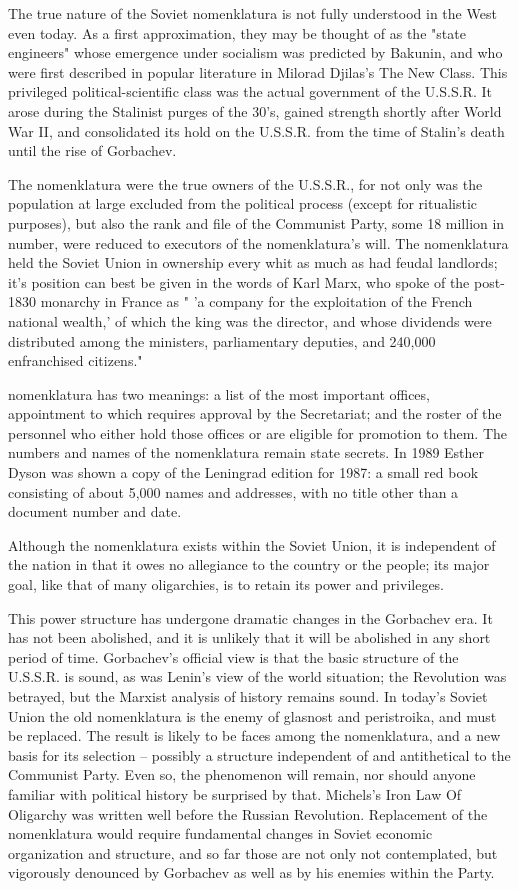 The true nature of the Soviet nomenklatura is not fully understood in the West even today. As a first approximation, they may be thought of as the "state engineers" whose emergence under socialism was predicted by Bakunin, and who were first described in popular literature in Milorad Djilas's The New Class. This privileged political-scientific class was the actual government of the U.S.S.R. It arose during the Stalinist purges of the 30's, gained strength shortly after World War II, and consolidated its hold on the U.S.S.R. from the time of Stalin's death until the rise of Gorbachev.

The nomenklatura were the true owners of the U.S.S.R., for not only was the population at large excluded from the political process (except for ritualistic purposes), but also the rank and file of the Communist Party, some 18 million in number, were reduced to executors of the nomenklatura's will. The nomenklatura held the Soviet Union in ownership every whit as much as had feudal landlords; it's position can best be given in the words of Karl Marx, who spoke of the post-1830 monarchy in France as " 'a company for the exploitation of the French national wealth,' of which the king was the director, and whose dividends were distributed among the ministers, parliamentary deputies, and 240,000 enfranchised citizens."

nomenklatura has two meanings: a list of the most important offices, appointment to which requires approval by the Secretariat; and the roster of the personnel who either hold those offices or are eligible for promotion to them. The numbers and names of the nomenklatura remain state secrets. In 1989 Esther Dyson was shown a copy of the Leningrad edition for 1987: a small red book consisting of about 5,000 names and addresses, with no title other than a document number and date.

Although the nomenklatura exists within the Soviet Union, it is independent of the nation in that it owes no allegiance to the country or the people; its major goal, like that of many oligarchies, is to retain its power and privileges.

This power structure has undergone dramatic changes in the Gorbachev era. It has not been abolished, and it is unlikely that it will be abolished in any short period of time. Gorbachev's official view is that the basic structure of the U.S.S.R. is sound, as was Lenin's view of the world situation; the Revolution was betrayed, but the Marxist analysis of history remains sound. In today's Soviet Union the old nomenklatura is the enemy of glasnost and peristroika, and must be replaced. The result is likely to be faces among the nomenklatura, and a new basis for its selection -- possibly a structure independent of and antithetical to the Communist Party. Even so, the phenomenon will remain, nor should anyone familiar with political history be surprised by that. Michels's Iron Law Of Oligarchy was written well before the Russian Revolution. Replacement of the nomenklatura would require fundamental changes in Soviet economic organization and structure, and so far those are not only not contemplated, but vigorously denounced by Gorbachev as well as by his enemies within the Party.

